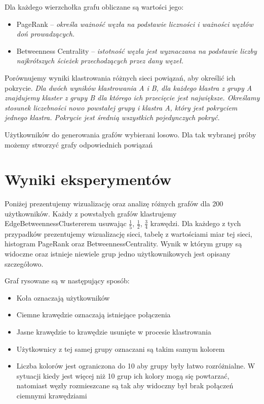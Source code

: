 \documentclass[10pt,a4paper,epic,carom]{article}
\begin{document}
Dla każdego wierzchołka grafu obliczane są wartości jego:
\begin{itemize}
\item PageRank – {\itshape określa ważność węzła na podstawie liczności i ważności węzłów doń prowadzących.}
\item Betweenness Centrality – {\itshape istotność węzła jest wyznaczana na podstawie liczby najkrótszych ścieżek przechodzących przez dany węzeł.}
\end{itemize}

Porównujemy wyniki klastrowania różnych sieci powiązań, aby określić ich pokrycie. 
{\itshape Dla dwóch wyników klastrowania A i B, dla każdego klastra z grupy A znajdujemy klaster z grupy B dla którego ich przecięcie jest największe. Określamy stosunek liczebności nowo powstałej grupy i klastra A, który jest pokryciem jednego klastra. Pokrycie jest średnią wszystkich pojedynczych pokryć.}

	Użytkowników do generowania grafów wybierani losowo. Dla tak wybranej próby możemy stworzyć grafy odpowiednich powiązań


\section{Wyniki eksperymentów}

	Poniżej prezentujemy wizualizację oraz analizę różnych grafów dla 200 użytkowników. Każdy z powstałych grafów klastrujemy EdgeBetweennessClustererem usuwając $\frac{1}{5}$, $\frac{1}{2}$, $\frac{3}{4}$ krawędzi. Dla każdego z tych przypadków prezentujemy wizualizację sieci, tabelę z wartościami miar tej sieci, histogram PageRank oraz BetweennessCentrality. Wynik w którym grupy są widoczne oraz istnieje niewiele grup jedno użytkownikowych jest opisany szczegółowo.


Graf rysowane są w następujący sposób:
\begin{itemize}
	\item Koła oznaczają użytkowników
	\item Ciemne krawędzie oznaczają istniejące połączenia
	\item Jasne krawędzie to krawędzie usunięte w procesie klastrowania
	\item Użytkownicy z tej samej grupy oznaczani są takim samym kolorem
	\item Liczba kolorów jest ograniczona do 10 aby grupy były łatwo rozróżnialne. W sytuacji kiedy jest więcej niż 10 grup ich kolory mogą się powtarzać, natomiast węzły rozmieszcane są tak aby widoczny był brak połączeń ciemnymi krawędziami
\end{itemize} 
\end{document}
